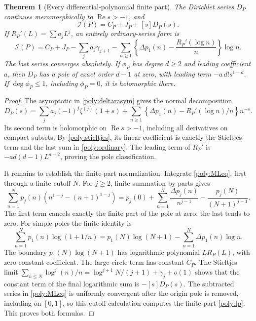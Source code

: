 \documentclass[11pt,a4paper]{article}
\numberwithin{equation}{section}
\newtheorem{theorem}{Theorem}[section]
\theoremstyle{definition}
\theoremstyle{remark}
\DeclareMathOperator{\re}{Re}
\newcommand{\cI}{\mathcal I}
\begin{document}
\begin{theorem}[Every differential-polynomial finite part]
\label{poly:bridge}
The Dirichlet series $D_P$ continues meromorphically to $\re s>-1$,
and
\begin{equation}\label{poly:bridgeeq}
 \boxed{\cI(P)=C_P+J_P+[s]D_P(s).}
\end{equation}
If $R_P'(L)=\sum a_jL^j$, an entirely ordinary-series form is
\begin{equation}\label{poly:ordinary}
 \cI(P)=C_P+J_P-\sum_j a_j\gamma_{j+1}
 -\sum_{n\ge1}
 \left\{\Delta p_1(n)-\frac{R_P'(\log n)}n\right\}\log n.
\end{equation}
The last series converges absolutely. If $\phi_P$ has degree $d\ge2$
and leading coefficient $a$, then $D_P$ has a pole of exact order
$d-1$ at zero, with leading term $-a\,d!s^{1-d}$. If
$\deg\phi_P\le1$, including $\phi_P=0$, it is holomorphic there.
\end{theorem}

\begin{proof}
The asymptotic in \eqref{poly:deltarasym} gives the normal decomposition
\[
 D_P(s)=\sum_j a_j(-1)^j\zeta^{(j)}(1+s)
 +\sum_{n\ge1}
 \left\{\Delta p_1(n)-R_P'(\log n)/n\right\}n^{-s}.
\]
Its second term is holomorphic on $\re s>-1$, including all derivatives
on compact subsets. By \eqref{poly:stieltjes}, its linear coefficient
is exactly the Stieltjes term and the last sum in
\eqref{poly:ordinary}. The leading term of $R_P'$ is
$-a d(d-1)L^{d-2}$, proving the pole classification.

It remains to establish the finite-part normalization. Integrate
\eqref{poly:MLeq}, first through a finite cutoff $N$. For $j\ge2$,
finite summation by parts gives
\[
 \sum_{n=1}^Np_j(n)(n^{1-j}-(n+1)^{1-j})
 =p_j(0)+\sum_{n=1}^N\frac{\Delta p_j(n)}{n^{j-1}}
   -\frac{p_j(N)}{(N+1)^{j-1}}.
\]
The first term cancels exactly the finite part of the pole at zero;
the last tends to zero. For simple poles the finite identity is
\[
 \sum_{n=1}^Np_1(n)\log(1+1/n)
 =p_1(N)\log(N+1)-\sum_{n=1}^N\Delta p_1(n)\log n.
\]
The boundary $p_1(N)\log(N+1)$ has logarithmic polynomial
$L R_P(L)$, with zero constant coefficient. The large-circle term
has constant $C_P$. The Stieltjes limit
$\sum_{n\le N}\log^j(n)/n
=\log^{j+1}N/(j+1)+\gamma_j+o(1)$ shows that the constant term of
the final logarithmic sum is $-[s]D_P(s)$. The subtracted series in
\eqref{poly:MLeq} is uniformly convergent after the origin pole is
removed, including on $[0,1]$, so this cutoff calculation computes the
finite part \eqref{poly:fp}. This proves both formulas.
\end{proof}
\end{document}
